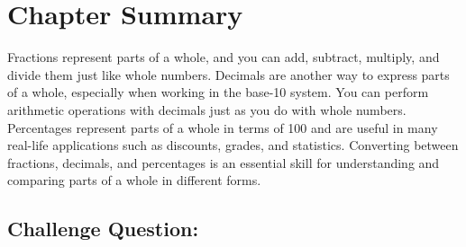 \section{Chapter Summary}
Fractions represent parts of a whole, and you can add, subtract, multiply, and divide them just like whole numbers.
Decimals are another way to express parts of a whole, especially when working in the base-10 system. You can perform arithmetic operations with decimals just as you do with whole numbers.
Percentages represent parts of a whole in terms of 100 and are useful in many real-life applications such as discounts, grades, and statistics.
Converting between fractions, decimals, and percentages is an essential skill for understanding and comparing parts of a whole in different forms.

\subsection{Challenge Question:}
